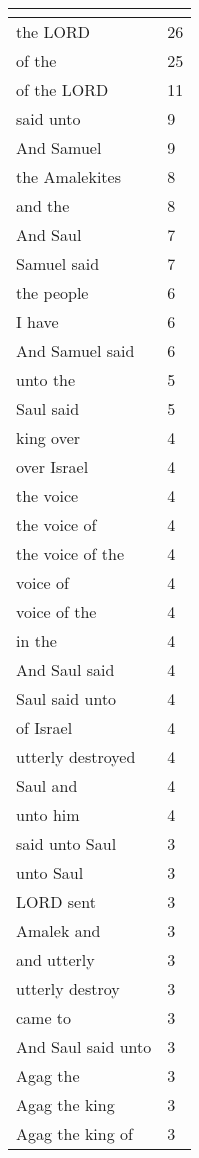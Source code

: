 \begin{center}
\begin{longtable}{|p{3.0in}|p{0.5in}|}
\hline \multicolumn{2}{c}{{ }} \\ \hline
\endfoot 
the LORD & 26\\ \hline 
of the & 25\\ \hline 
of the LORD & 11\\ \hline 
said unto & 9\\ \hline 
And Samuel & 9\\ \hline 
the Amalekites & 8\\ \hline 
and the & 8\\ \hline 
And Saul & 7\\ \hline 
Samuel said & 7\\ \hline 
the people & 6\\ \hline 
I have & 6\\ \hline 
And Samuel said & 6\\ \hline 
unto the & 5\\ \hline 
Saul said & 5\\ \hline 
king over & 4\\ \hline 
over Israel & 4\\ \hline 
the voice & 4\\ \hline 
the voice of & 4\\ \hline 
the voice of the & 4\\ \hline 
voice of & 4\\ \hline 
voice of the & 4\\ \hline 
in the & 4\\ \hline 
And Saul said & 4\\ \hline 
Saul said unto & 4\\ \hline 
of Israel & 4\\ \hline 
utterly destroyed & 4\\ \hline 
Saul and & 4\\ \hline 
unto him & 4\\ \hline 
said unto Saul & 3\\ \hline 
unto Saul & 3\\ \hline 
LORD sent & 3\\ \hline 
Amalek and & 3\\ \hline 
and utterly & 3\\ \hline 
utterly destroy & 3\\ \hline 
came to & 3\\ \hline 
And Saul said unto & 3\\ \hline 
Agag the & 3\\ \hline 
Agag the king & 3\\ \hline 
Agag the king of & 3\\ \hline 

\end{longtable}
\end{center}
